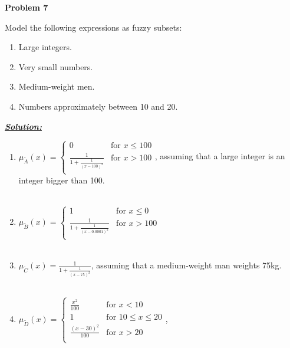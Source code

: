 \documentclass{article}
\begin{document}
\newpage
\noindent \textbf{Problem 7}

\noindent Model the following expressions as fuzzy subsets:
\begin{enumerate} [label = \Alph*]
    \item Large integers.
    \item Very small numbers.
    \item Medium-weight men.
    \item Numbers approximately between 10 and 20.
\end{enumerate}

\vspace{1cm}

\noindent \underline{\textbf{\textit{Solution:}}}\\
\begin{enumerate} [label = \Alph*]
  \item $\mu_{\utilde{A}}(x) = \begin{cases}
    0 &\text{for } x \leq 100 \\
    \frac{1}{1+\frac{1}{(x-100)^2}} &\text{for } x>100\\
    
  \end{cases}$, assuming that a large integer is an integer bigger than 100.\\\\
  \item $\mu_{\utilde{B}}(x) = \begin{cases}
    1 &\text{for } x \leq 0 \\
    \frac{1}{1+\frac{1}{(x-0.0001)^2}} &\text{for } x>100\\
  \end{cases}$ \\ \\
  \item $\mu_{\utilde{C}}(x) = 
    \frac{1}{1+\frac{1}{(x-75)^2}}$, assuming that a medium-weight man weights 75kg.\\\\
  \item $\mu_{\utilde{D}}(x) = \begin{cases}
    \frac{x^2}{100} & \text{for } x<10 \\
    1 &\text{for } 10 \leq x \leq 20 \\
    \frac{(x-30)^2}{100} &\text{for } x>20\\
    
  \end{cases}$,
\end{enumerate}
\end{document}
